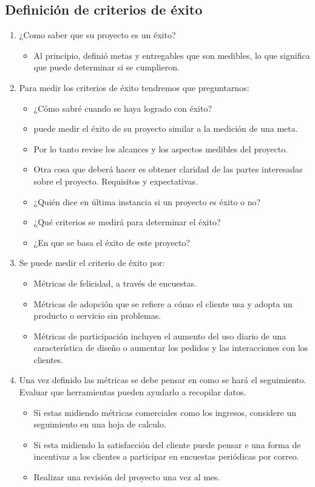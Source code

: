 \documentclass[10pt]{book}
\begin{document}
	\subsection{Definición de criterios de éxito}
	    \begin{enumerate}
		\item ¿Como saber que su proyecto es un éxito?
		    \begin{itemize}
			\item Al principio, definió metas y entregables que son medibles, lo que significa que puede determinar si se cumplieron.
		    \end{itemize}
		\item Para medir los criterios de éxito tendremos que preguntarnos:
		    \begin{itemize}
			\item ¿Cómo sabré cuando se haya logrado con éxito?
			\item puede medir el éxito de su proyecto similar a la medición de una meta.
			\item Por lo tanto revise los alcances y los aspectos medibles del proyecto.
			\item Otra cosa que deberá hacer es obtener claridad de las partes interesadas sobre el proyecto. Requisitos y expectativas. 
			\item ¿Quién dice en última instancia si un proyecto es éxito o no?
			\item ¿Qué criterios se medirá para determinar el éxito?
			\item ¿En que se basa el éxito de este proyecto?
		    \end{itemize}

		\item Se puede medir el criterio de éxito  por:
		    \begin{itemize}
			\item Métricas de felicidad, a través de encuestas.
			\item Métricas de adopción que se refiere a cómo el cliente usa y adopta un producto o servicio sin problemas. 
			\item Métricas de participación incluyen el aumento del uso diario de una característica de diseño o aumentar los pedidos y las interacciones con los clientes.
		    \end{itemize}
		\item Una vez definido las métricas se debe pensar en como se hará el seguimiento. Evaluar que herramientas pueden ayudarlo a recopilar datos.
		    \begin{itemize}
			\item Si estas midiendo métricas comerciales como los ingresos, considere un seguimiento en una hoja de calculo.
			\item Si esta midiendo la satisfacción del cliente puede pensar e una forma de incentivar a los clientes a participar en encuestas periódicas por correo.
			\item Realizar una revisión del proyecto una vez al mes.
		    \end{itemize}


\end{enumerate}
\end{document}
